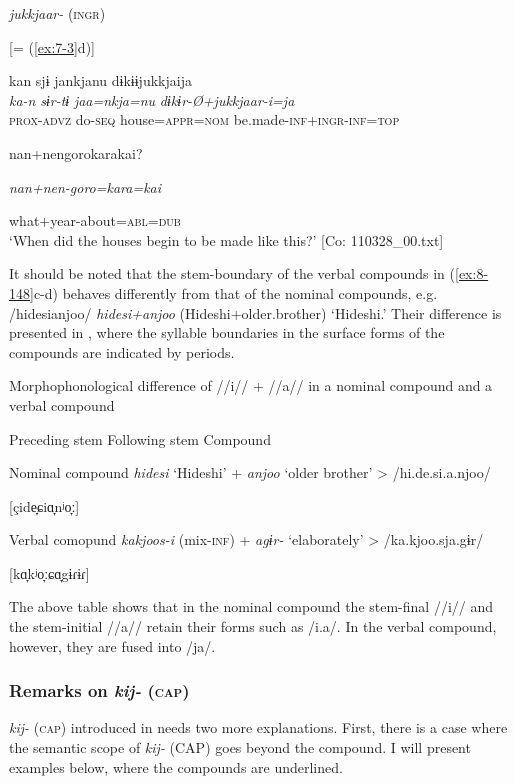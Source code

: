   \textit{jukkjaar-} (\textsc{ingr})

\ex{}  [= (\ref{ex:7-3}d)]

{\TM}
\glll  kan  sjɨ  jankjanu  dɨkɨɨjukkjaija\\
\textit{ka-n}  \textit{sɨr-tɨ}  \textit{jaa=nkja=nu}  \textit{dɨkɨr-Ø+jukkjaar-i=ja}\\
\textsc{prox}-\textsc{advz}  do-\textsc{seq}  house=\textsc{appr}=\textsc{nom}  be.made-\textsc{inf}+\textsc{ingr}-\textsc{inf}=\textsc{top}

      {\textbar}nan+nengoro{\textbar}karakai?

      \textit{nan+nen-goro=kara=kai}

      what+year-about=\textsc{abl}=\textsc{dub}\\
\glt ‘When did the houses begin to be made like this?’ [Co: 110328\_00.txt]
\z
\z

It should be noted that the stem-boundary of the verbal compounds in (\ref{ex:8-148}c-d) behaves differently from that of the nominal compounds, e.g. /hidesianjoo/ \textit{hidesi+anjoo} (Hideshi+older.brother) ‘Hideshi.’ Their difference is presented in , where the syllable boundaries in the surface forms of the compounds are indicated by periods.

\begin{table}
\caption{\label{tab:key:88}Morphophonological difference of //i// + //a// in a nominal compound and a verbal compound}
  Preceding stem    Following stem    Compound

Nominal compound  \textit{hidesi}  ‘Hideshi’  +  \textit{anjoo}  ‘older brother’  >  /hi.de.si.a.njoo/

[çide̞ɕiɑ̞nʲo̞ː]

Verbal comopund  \textit{kakjoos-i}  (mix-\textsc{inf})  +  \textit{agɨr-}  ‘elaborately’  >  /ka.kjoo.sja.gɨr/

[kɑ̞kʲo̞ːɕɑ̞gɨɾɨɾ]
\end{table}


The above table shows that in the nominal compound the stem-final //i// and the stem-initial //a// retain their forms such as /i.a/. In the verbal compound, however, they are fused into /ja/.

\subsubsection{Remarks on \textit{kij-} (\textsc{cap})}

\textit{kij-} (\textsc{cap}) introduced in  needs two more explanations. First, there is a case where the semantic scope of \textit{kij-} (CAP) goes beyond the compound. I will present examples below, where the compounds are underlined.


